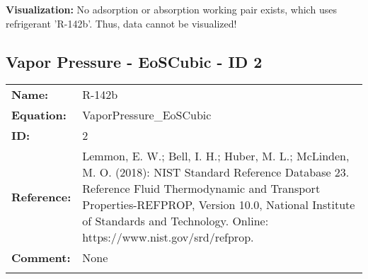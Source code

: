 \textbf{Visualization:}
%
\newline
No adsorption or absorption working pair exists, which uses refrigerant 'R-142b'. Thus, data cannot be visualized!
%

\FloatBarrier
\newpage
\subsection{Vapor Pressure - EoSCubic - ID 2}
%
\begin{tabular}[l]{|lp{11.5cm}|}
\hline
\addlinespace

\textbf{Name:} & R-142b \\
\textbf{Equation:} & VaporPressure\_EoSCubic \\
\textbf{ID:} & 2 \\
\textbf{Reference:} & Lemmon, E. W.; Bell, I. H.; Huber, M. L.; McLinden, M. O. (2018): NIST Standard Reference Database 23. Reference Fluid Thermodynamic and Transport Properties-REFPROP, Version 10.0, National Institute of Standards and Technology. Online: https://www.nist.gov/srd/refprop. \\
\textbf{Comment:} & None \\

\addlinespace
\hline
\end{tabular}
\newline

